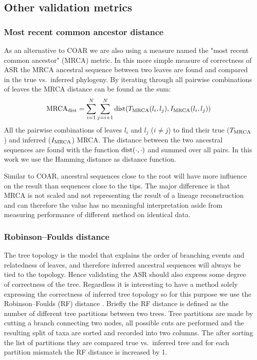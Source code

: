 \subsection{Other validation metrics}

\subsubsection{Most recent common ancestor distance}
As an alternative to COAR we are also using a measure named the "most recent common ancestor" (MRCA) metric.
In this more simple measure of correctness of ASR the MRCA ancestral sequence between two leaves are found and compared in the true vs.\ inferred phylogeny.
By iterating through all pairwise combinations of leaves the MRCA distance can be found as the sum:
$$
\text{\text{MRCA}}_{\text{dist}} = \sum_{i=1}^{N} \sum_{j=i+1}^{N} \text{dist}(T_{\text{\text{MRCA}}}(l_i, l_j), I_{\text{\text{MRCA}}}(l_i, l_j))
$$
All the pairwise combinations of leaves $l_i$ and $l_j$ ($i \neq j$) to find their true ($T_{\text{\text{MRCA}}}$) and inferred ($I_{\text{\text{MRCA}}}$) MRCA.
The distance between the two ancestral sequences are found with the function $\text{dist}(\cdot, \cdot)$ and summed over all pairs.
In this work we use the Hamming distance as distance function.

Similar to COAR, ancestral sequences close to the root will have more influence on the result than sequences close to the tips.
The major difference is that MRCA is not scaled and not representing the result of a lineage reconstruction and can therefore the value has no meaningful interpretation aside from measuring performance of different method on identical data.


\subsubsection{Robinson–Foulds distance}
The tree topology is the model that explains the order of branching events and relatedness of leaves, and therefore inferred ancestral sequences will always be tied to the topology.
Hence validating the ASR should also express some degree of correctness of the tree.
Regardless it is interesting to have a method solely expressing the correctness of inferred tree topology so for this purpose we use the Robinson–Foulds (RF) distance \cite{robinson1981comparison}.
Briefly the RF distance is defined as the number of different tree partitions between two trees.
Tree partitions are made by cutting a branch connecting two nodes, all possible cuts are performed and the resulting split of taxa are sorted and recorded into two columns.
The after sorting the list of partitions they are compared true vs.\ inferred tree and for each partition mismatch the RF distance is increased by 1.




